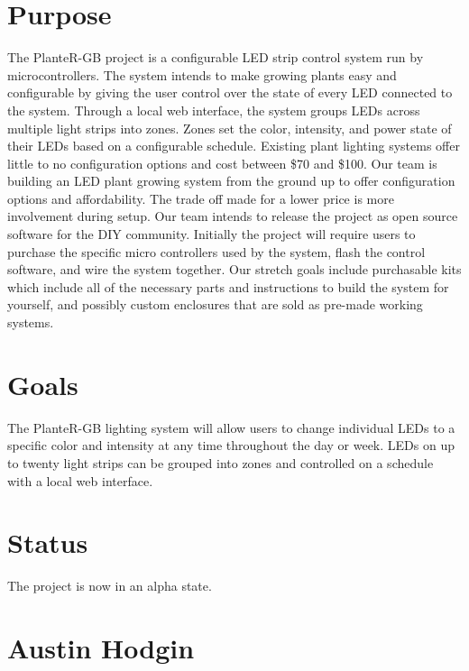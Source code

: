 \documentclass[onecolumn, draftclsnofoot,10pt, compsoc]{IEEEtran}
\begin{document}
	\section{Purpose}
	The PlanteR-GB project is a configurable LED strip control system run by microcontrollers.
	The system intends to make growing plants easy and configurable by giving the user control over the state of every LED connected to the system.
	Through a local web interface, the system groups LEDs across multiple light strips into zones.
	Zones set the color, intensity, and power state of their LEDs based on a configurable schedule.
	Existing plant lighting systems offer little to no configuration options and cost between \$70 and \$100. \cite{expensive1} \cite{expensive2} \cite{expensive3}
	Our team is building an LED plant growing system from the ground up to offer configuration options and affordability.
	The trade off made for a lower price is more involvement during setup. Our team intends to release the project as open source software for the DIY community.
	Initially the project will require users to purchase the specific micro controllers used by the system, flash the control software, and wire the system together.
	Our stretch goals include purchasable kits which include all of the necessary parts and instructions to build the system for yourself, and possibly custom enclosures that are sold as pre-made working systems.

	\section{Goals}
	The PlanteR-GB lighting system will allow users to change individual LEDs to a specific color and intensity at any time throughout the day or week.
	LEDs on up to twenty light strips can be grouped into zones and controlled on a schedule with a local web interface.

	\section{Status}
	The project is now in an alpha state.

	\section{Austin Hodgin}
\end{document}
